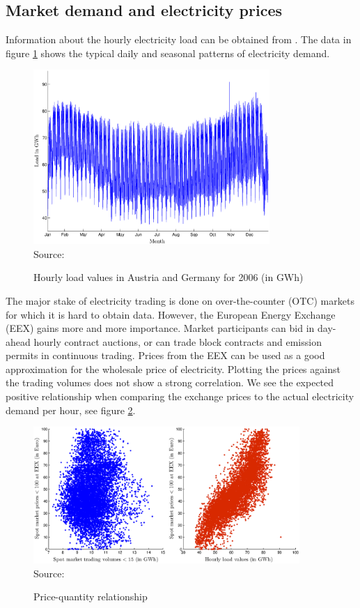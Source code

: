 \clearpage
\subsection{Market demand and electricity prices}
\label{sec:mark-demand-electr}

Information about the hourly electricity load can be obtained from \cite{UCTE2006}. The data in figure \ref{fig:load} shows the typical daily and seasonal patterns of electricity demand.

\begin{figure}[htb]
  \centering
\caption{Hourly load values in Austria and Germany for 2006 (in GWh)}
\includegraphics[width=0.8\textwidth]{numericalpaper/loadvalues}
  \label{fig:load}
\\
 \scriptsize Source: \cite{UCTE2006}
\end{figure}


The major stake of electricity trading is done on over-the-counter (OTC) markets for which it is hard to obtain data. However, the European Energy Exchange (EEX) gains more and more importance. Market participants can bid in day-ahead hourly contract auctions, or can trade block contracts and emission permits in continuous trading. Prices from the EEX can be used as a good approximation for the wholesale price of electricity. Plotting the prices against the trading volumes does not show a strong correlation. We see the expected positive relationship when comparing the exchange prices to the actual electricity demand per hour, see figure \ref{fig:pricequant}.

\begin{figure}[htb]
  \centering
\caption{Price-quantity relationship}
  \includegraphics[width=0.9\textwidth]{numericalpaper/pricequant}
  \label{fig:pricequant}
\\
 \scriptsize Source: \cite{EEX2006, UCTE2006}
\end{figure}

